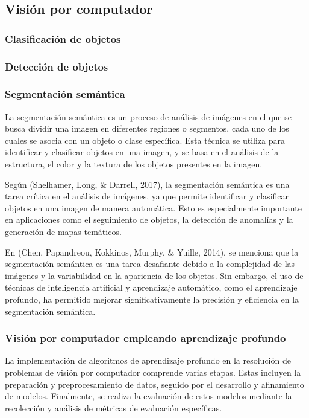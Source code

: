 \subsection{Visión por computador}

\subsubsection{Clasificación de objetos}


\subsubsection{Detección de objetos}

\subsubsection{Segmentación semántica}

La segmentación semántica es un proceso de análisis de imágenes en el que se busca dividir una imagen en diferentes regiones o segmentos, cada uno de los cuales se asocia con un objeto o clase específica. Esta técnica se utiliza para identificar y clasificar objetos en una imagen, y se basa en el análisis de la estructura, el color y la textura de los objetos presentes en la imagen.

Según (Shelhamer, Long, \& Darrell, 2017), la segmentación semántica es una tarea crítica en el análisis de imágenes, ya que permite identificar y clasificar objetos en una imagen de manera automática. Esto es especialmente importante en aplicaciones como el seguimiento de objetos, la detección de anomalías y la generación de mapas temáticos.

En (Chen, Papandreou, Kokkinos, Murphy, \& Yuille, 2014), se menciona que la segmentación semántica es una tarea desafiante debido a la complejidad de las imágenes y la variabilidad en la apariencia de los objetos. Sin embargo, el uso de técnicas de inteligencia artificial y aprendizaje automático, como el aprendizaje profundo, ha permitido mejorar significativamente la precisión y eficiencia en la segmentación semántica.

\subsubsection{Visión por computador empleando aprendizaje profundo}

La implementación de algoritmos de aprendizaje profundo en la resolución de problemas de visión por computador comprende varias etapas. Estas incluyen la preparación y preprocesamiento de datos, seguido por el desarrollo y afinamiento de modelos. Finalmente, se realiza la evaluación de estos modelos mediante la recolección y análisis de métricas de evaluación específicas.

